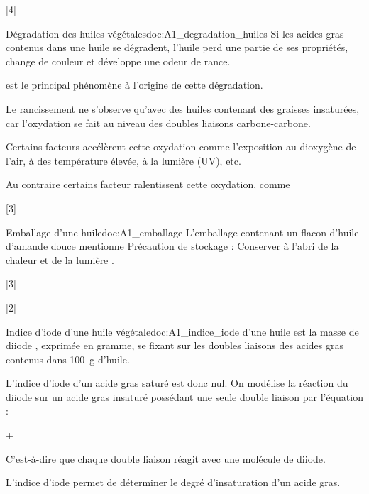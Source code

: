 \newpage
\vspace*{-30pt}
[4]


\begin{doc}{Dégradation des huiles végétales}{doc:A1_degradation_huiles}
  Si les acides gras contenus dans une huile se dégradent, l’huile perd une partie de ses propriétés, change de couleur et développe une odeur de rance.
  \begin{importants}  
     est le principal phénomène à l’origine de cette dégradation.
  \end{importants}
  Le rancissement ne s'observe qu'avec des huiles contenant des graisses insaturées, car l'oxydation se fait au niveau des doubles liaisons carbone-carbone.
  \begin{importants}  
    Certains facteurs accélèrent cette oxydation comme l’exposition au dioxygène de l’air, à des température élevée, à la lumière (UV), etc.
  \end{importants}
  \begin{importants}
    Au contraire certains facteur ralentissent cette oxydation, comme 
  \end{importants}
\end{doc}


[3]

\begin{doc}{Emballage d'une huile}{doc:A1_emballage}  
  L'emballage contenant un flacon d'huile d'amande douce mentionne \og Précaution de stockage : Conserver à l’abri de la chaleur et de la lumière \fg.
\end{doc}

[3]

[2]

\begin{doc}{Indice d’iode d’une huile végétale}{doc:A1_indice_iode}
   d'une huile est la masse de diiode \diiode, exprimée en gramme, se fixant sur les doubles liaisons des acides gras contenus dans \qty{100}{g} d’huile.
  
  L'indice d'iode d'un acide gras saturé est donc nul.
  On modélise la réaction du diiode \diiode sur un acide gras insaturé possédant une seule double liaison par l’équation :
  \begin{center}
     + \diiode \reaction {}
  \end{center}
  C'est-à-dire que chaque double liaison réagit avec une molécule de diiode.

  \begin{importants}
    L'indice d'iode permet de déterminer le degré d'insaturation d'un acide gras.
  \end{importants}
\end{doc}

